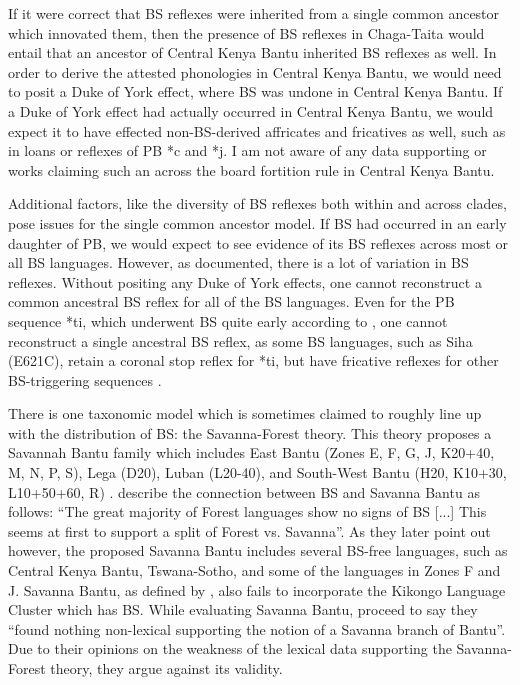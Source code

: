 \documentclass[output=paper,colorlinks,citecolor=brown
]{langscibook}
\begin{document}
If it were correct that BS reflexes were inherited from a single common ancestor which innovated them, then the presence of BS reflexes in Chaga-Taita would entail that an ancestor of Central Kenya Bantu inherited BS reflexes as well. In order to derive the attested phonologies in Central Kenya Bantu, we would need to posit a Duke of York effect, where BS was undone in Central Kenya Bantu. If a Duke of York effect had actually occurred in Central Kenya Bantu, we would expect it to have effected non-BS-derived affricates and fricatives as well, such as in loans or reflexes of PB *c and *j. I am not aware of any data supporting or works claiming such an across the board fortition rule in Central Kenya Bantu.

 Additional factors, like the diversity of BS reflexes \citep{Janson2007} both within and across clades, pose issues for the single common ancestor model. If BS had occurred in an early daughter of PB, we would expect to see evidence of its BS reflexes across most or all BS languages. However, as \citeauthor{Janson2007} documented, there is a lot of variation in BS reflexes. Without positing any Duke of York effects, one cannot reconstruct a common ancestral BS reflex for all of the BS languages. Even for the PB sequence *ti, which underwent BS quite early according to \citeauthor{Janson2007}, one cannot reconstruct a single ancestral BS reflex, as some BS languages, such as Siha (E621C), retain a coronal stop reflex for *ti, but have fricative reflexes for other BS-triggering sequences \citep{nurse1981}.

There is one taxonomic model which is sometimes claimed to roughly line up with the distribution of BS: the Savanna-Forest theory. This theory proposes a Savannah Bantu family which includes East Bantu (Zones E, F, G, J, K20+40, M, N, P, S), Lega (D20), Luban (L20-40), and South-West Bantu (H20, K10+30, L10+50+60, R) \citep{ehret1999}. \citet[174]{NursePhillipson2003} describe the connection between BS and Savanna Bantu as follows: “The great majority of Forest languages show no signs of BS [...] This seems at first to support a split of Forest vs. Savanna”. As they later point out however, the proposed Savanna Bantu includes several BS-free languages, such as Central Kenya Bantu, Tswana-Sotho, and some of the languages in Zones F and J. Savanna Bantu, as defined by \citeauthor{ehret1999}, also fails to incorporate the Kikongo Language Cluster which has BS. While evaluating Savanna Bantu, \citet[174]{NursePhillipson2003} proceed to say they “found nothing non-lexical supporting the notion of a Savanna branch of Bantu”. Due to their opinions on the weakness of the lexical data supporting the Savanna-Forest theory, they argue against its validity.
\end{document}
